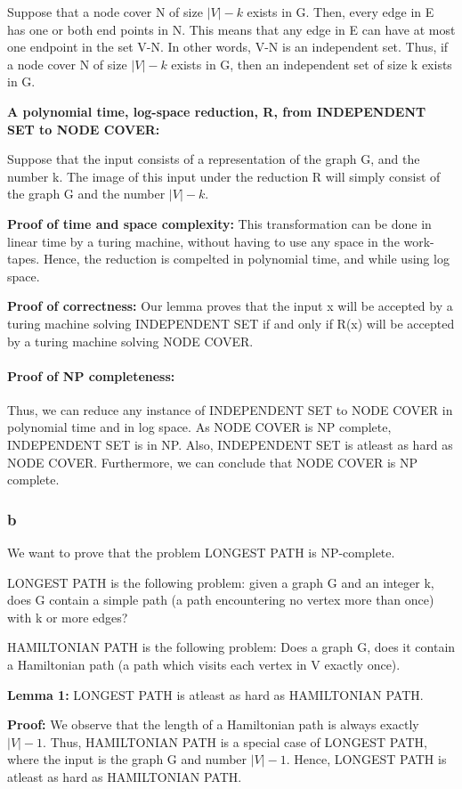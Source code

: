 \documentclass[10pt]{article}
\begin{document}
Suppose that a node cover N of size $|V|-k$ exists in G. Then, every edge in E has one or both end points in N. This means that any edge in E can have at most one endpoint in the set V-N. In other words, V-N is an independent set. Thus, if a node cover N of size $|V|-k$ exists in G, then an independent set of size k exists in G.

\textbf{A polynomial time, log-space reduction, R, from INDEPENDENT SET to NODE COVER:}

Suppose that the input consists of a representation of the graph G, and the number k. The image of this input under the reduction R will simply consist of the graph G and the number $|V|-k$.

\textbf{Proof of time and space complexity:} This transformation can be done in linear time by a turing machine, without having to use any space in the work-tapes. Hence, the reduction is compelted in polynomial time, and while using log space.

\textbf{Proof of correctness:} Our lemma proves that the input x will be accepted by a turing machine solving INDEPENDENT SET if and only if R(x) will be accepted by a turing machine solving NODE COVER.

\paragraph{Proof of NP completeness:} Thus, we can reduce any instance of INDEPENDENT SET to NODE COVER in polynomial time and in log space. As NODE COVER is NP complete, INDEPENDENT SET is in NP. Also, INDEPENDENT SET is atleast as hard as NODE COVER. Furthermore, we can conclude that NODE COVER is NP complete.

\subsubsection*{b}
We want to prove that the problem LONGEST PATH is NP-complete.

LONGEST PATH is the following problem: given a graph G and an integer k, does G contain a simple path (a path encountering no vertex more than once) with k or more edges?

HAMILTONIAN PATH is the following problem: Does a graph G, does it contain a Hamiltonian path (a path which visits each vertex in V exactly once).

\textbf{Lemma 1:} LONGEST PATH is atleast as hard as HAMILTONIAN PATH.

\textbf{Proof:}
We observe that the length of a Hamiltonian path is always exactly $|V|-1$. Thus, HAMILTONIAN PATH is a special case of LONGEST PATH, where the input is the graph G and number $|V|-1$. Hence, LONGEST PATH is atleast as hard as HAMILTONIAN PATH.
\end{document}
